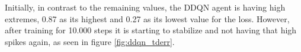 Initially, in contrast to the remaining values, the DDQN agent is having high extremes, 0.87 as its highest and 0.27 as its lowest value for the loss. However, after training for 10.000 steps it is starting to stabilize and not having that high spikes again, as seen in figure \ref{fig:ddqn_tderr}.

\begin{figure}[H]
	\centering
	\qquad
	\qquad

\end{figure}

